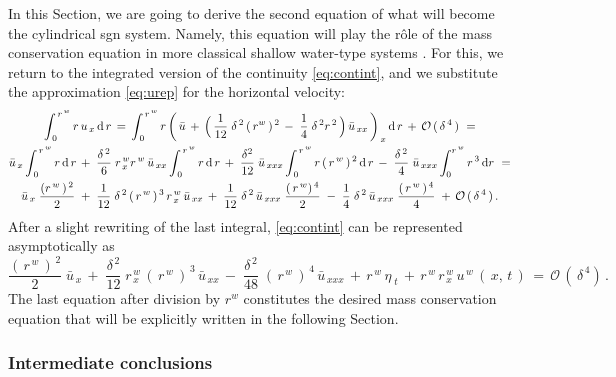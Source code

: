 \documentclass[alpha-refs, 12pt]{wiley-article}
\renewcommand{\O}{\mathcal{O}}
\begin{document}
In this Section, we are going to derive the second equation of what will become the cylindrical \acrshort{sgn} system. Namely, this equation will play the r\^ole of the mass conservation equation in more classical shallow water-type systems \cite{Dutykh2013, Dutykh2011b, Dutykh2014c, Dutykh2014f, Clamond2019}. For this, we return to the integrated version of the continuity \cref{eq:contint}, and we substitute the approximation \eqref{eq:urep} for the horizontal velocity:
\begin{multline*}
  \int_{\,0}^{\,r^{\,w}}r\,u_{\,x}\,\mathrm{d}\,r\,=\, \int_{\,0}^{\,r^{\,w}}r\,\biggl(\,\bar{u}\,+\,\Bigl(\,\frac{1}{12}\;\delta^{\,2}\,(\,r^{w}\,)^{\,2}\,-\;\frac{1}{4}\;\delta^{\,2}r^{\,2}\,\Bigr)\,\bar{u}_{\,xx}\,\biggr)_{\,x}\,\mathrm{d}\,r\,+\,\O\,(\,\delta^{\,4}\,)\ =\\
  \bar{u}_{\,x}\int_{\,0}^{\,r^{\,w}}r\,\mathrm{d}\,r\,+\; \frac{\delta^{\,2}}{6}\;r^{\,w}_{\,x}r^{\,w}\,\bar{u}_{\,xx} \int_{\,0}^{\,r^{\,w}}r\,\mathrm{d}\,r\,+\;\frac{\delta^{2}}{12}\;\bar{u}_{\,xxx}\int_{\,0}^{\,r^{\,w}}r\,(\,r^{\,w}\,)^{\,2}\,\mathrm{d}\,r\,-\;\frac{\delta^{\,2}}{4}\;\bar{u}_{\,xxx} \int_{0}^{r^{\,w}}r^{\,3}\,\mathrm{d}r\ =\\
  \bar{u}_{\,x}\;\frac{(r^{\,w}\,)^{\,2}}{2}\;+\;\frac{1}{12}\;\delta^{\,2}\,(\,r^{\,w}\,)^{\,3}\,r^{\,w}_{\,x}\,\bar{u}_{\,xx}\,+\;\frac{1}{12}\;\delta^{\,2}\,\bar{u}_{\,xxx}\;\frac{(\,r^{\,w})^{\,4}}{2}\;-\;\frac{1}{4}\;\delta^{\,2}\,\bar{u}_{\,xxx}\;\frac{(\,r^{\,w}\,)^{\,4}}{4}\; +\,\O\,(\,\delta^{\,4}\,)\,.
\end{multline*}
After a slight rewriting of the last integral, \cref{eq:contint} can be represented asymptotically as
\begin{equation*}
  \frac{(\,r^{\,w}\,)^{\,2}}{2}\;\bar{u}_{\,x}\,+\;\frac{\delta^{\,2}}{12}\;r^{\,w}_{\,x}\,(\,r^{\,w}\,)^{\,3}\,\bar{u}_{\,xx}\,-\;\frac{\delta^{\,2}}{48}\;(\,r^{\,w}\,)^{\,4}\,\bar{u}_{\,xxx}\,+\,r^{\,w}\,\eta_{\;t}\,+\,r^{\,w}\,r^{\,w}_{\,x}\,u^{\,w}\,(\,x,\,t\,)\, = \, \O\,(\,\delta^{\,4})\,.
\end{equation*}
The last equation after division by $r^w$ constitutes the desired mass conservation equation that will be explicitly written in the following Section.

\subsubsection{Intermediate conclusions}
\end{document}
